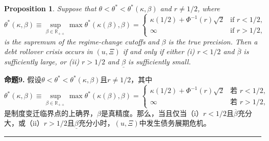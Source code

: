 \documentclass[12pt,a4paper]{article}
\newenvironment{translation}
  {\par\noindent\color{darkblue}\ignorespaces}
  {\par\medskip\noindent\hrule\par\medskip}
\newtheorem{proposition}[theorem]{Proposition}
\theoremstyle{definition}
\theoremstyle{remark}
\begin{document}
\begin{proposition}
Suppose that $\theta < \theta^* < \theta^*(\kappa, \beta)$ and $r \ne 1/2$, where
\[
\theta^*(\kappa, \beta) \equiv \sup_{\beta \in \mathbb{R}_{++}} \max \theta^*(\kappa(\beta), \beta) =
\begin{cases}
\kappa(1/2) + \Phi^{-1}(r)\sqrt{2} & \text{if } r < 1/2,\\
\infty & \text{if } r > 1/2,
\end{cases}
\]
is the supremum of the regime-change cutoffs and $\beta$ is the true precision. Then a debt rollover crisis occurs in $(u, \Xi)$ if and only if either (i) $r < 1/2$ and $\overline{\beta}$ is sufficiently large, or (ii) $r > 1/2$ and $\underline{\beta}$ is sufficiently small.
\end{proposition}
\begin{translation}
\color{darkblue}\textbf{命题9.} 假设$\theta < \theta^* < \theta^*(\kappa, \beta)$且$r \ne 1/2$，其中
\[
\theta^*(\kappa, \beta) \equiv \sup_{\beta \in \mathbb{R}_{++}} \max \theta^*(\kappa(\beta), \beta) =
\begin{cases}
\kappa(1/2) + \Phi^{-1}(r)\sqrt{2} & \text{若 } r < 1/2,\\
\infty & \text{若 } r > 1/2,
\end{cases}
\]
是制度变迁临界点的上确界，$\beta$是真精度。那么，当且仅当（i）$r < 1/2$且$\overline{\beta}$充分大，或（ii）$r > 1/2$且$\underline{\beta}$充分小时，$(u, \Xi)$中发生债务展期危机。
\end{translation}
\end{document}
